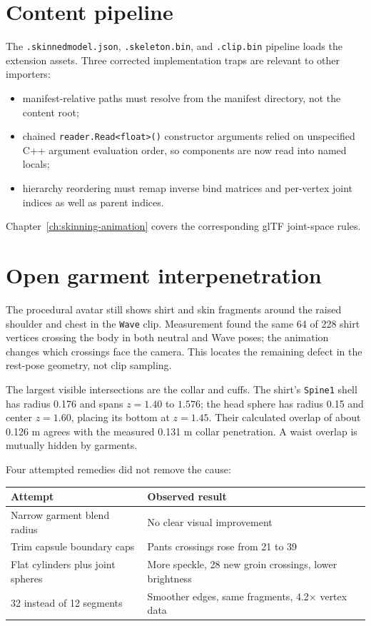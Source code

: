\section{Content pipeline}

The \texttt{.skinnedmodel.json}, \texttt{.skeleton.bin}, and \texttt{.clip.bin} pipeline loads
the extension assets. Three corrected implementation traps are relevant to other importers:

\begin{itemize}
  \item manifest-relative paths must resolve from the manifest directory, not the content root;
  \item chained \texttt{reader.Read<float>()} constructor arguments relied on unspecified C++
        argument evaluation order, so components are now read into named locals;
  \item hierarchy reordering must remap inverse bind matrices and per-vertex joint indices as
        well as parent indices.
\end{itemize}

Chapter~\ref{ch:skinning-animation} covers the corresponding glTF joint-space rules.

\section{Open garment interpenetration}

The procedural avatar still shows shirt and skin fragments around the raised shoulder and
chest in the \texttt{Wave} clip. Measurement found the same 64 of 228 shirt vertices crossing
the body in both neutral and Wave poses; the animation changes which crossings face the camera.
This locates the remaining defect in the rest-pose geometry, not clip sampling.

The largest visible intersections are the collar and cuffs. The shirt's \texttt{Spine1} shell
has radius 0.176 and spans $z=1.40$ to $1.576$; the head sphere has radius 0.15 and center
$z=1.60$, placing its bottom at $z=1.45$. Their calculated overlap of about 0.126 m agrees with
the measured 0.131 m collar penetration. A waist overlap is mutually hidden by garments.

Four attempted remedies did not remove the cause:

\begin{center}
\begin{tabularx}{\textwidth}{@{}lX@{}}
\toprule
\textbf{Attempt} & \textbf{Observed result} \\
\midrule
Narrow garment blend radius & No clear visual improvement \\
Trim capsule boundary caps & Pants crossings rose from 21 to 39 \\
Flat cylinders plus joint spheres & More speckle, 28 new groin crossings, lower brightness \\
32 instead of 12 segments & Smoother edges, same fragments, 4.2$\times$ vertex data \\
\bottomrule
\end{tabularx}
\end{center}

